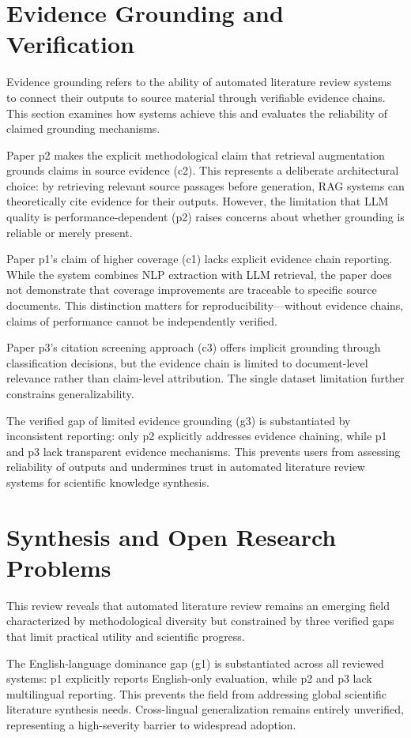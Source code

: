 \documentclass{article}
\begin{document}
\section{Evidence Grounding and Verification}
Evidence grounding refers to the ability of automated literature review systems to connect their outputs to source material through verifiable evidence chains. This section examines how systems achieve this and evaluates the reliability of claimed grounding mechanisms.

Paper p2 makes the explicit methodological claim that retrieval augmentation grounds claims in source evidence (c2). This represents a deliberate architectural choice: by retrieving relevant source passages before generation, RAG systems can theoretically cite evidence for their outputs. However, the limitation that LLM quality is performance-dependent (p2) raises concerns about whether grounding is reliable or merely present.

Paper p1's claim of higher coverage (c1) lacks explicit evidence chain reporting. While the system combines NLP extraction with LLM retrieval, the paper does not demonstrate that coverage improvements are traceable to specific source documents. This distinction matters for reproducibility—without evidence chains, claims of performance cannot be independently verified.

Paper p3's citation screening approach (c3) offers implicit grounding through classification decisions, but the evidence chain is limited to document-level relevance rather than claim-level attribution. The single dataset limitation further constrains generalizability.

The verified gap of limited evidence grounding (g3) is substantiated by inconsistent reporting: only p2 explicitly addresses evidence chaining, while p1 and p3 lack transparent evidence mechanisms. This prevents users from assessing reliability of outputs and undermines trust in automated literature review systems for scientific knowledge synthesis.

\section{Synthesis and Open Research Problems}
This review reveals that automated literature review remains an emerging field characterized by methodological diversity but constrained by three verified gaps that limit practical utility and scientific progress.

The English-language dominance gap (g1) is substantiated across all reviewed systems: p1 explicitly reports English-only evaluation, while p2 and p3 lack multilingual reporting. This prevents the field from addressing global scientific literature synthesis needs. Cross-lingual generalization remains entirely unverified, representing a high-severity barrier to widespread adoption.
\end{document}
